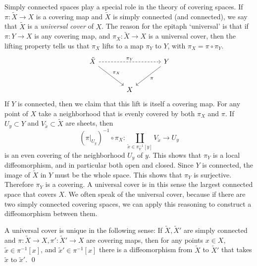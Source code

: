 Simply connected spaces play a special role in the theory of covering spaces.
If $\pi : \tilde{X} \to X$ is a covering map and $\tilde{X}$ is simply connected (and connected), we say that $\tilde{X}$ is a \emph{universal cover} of $X$.
The reason for the epitaph `universal' is that if $\pi : Y \to X$ is any covering map, and $\pi_X : \tilde{X} \to X$ is a universal cover, then the lifting property tells us that $\pi_X$ lifts to a map $\pi_Y$ to $Y$, with $\pi_X = \pi \circ \pi_Y$.
\[\begin{tikzcd}[sep=large]
\tilde{X} \arrow{rd}{\pi_X} \arrow[dashed]{rr}{\pi_Y} && Y \arrow{ld}{\pi} \\
& X &
\end{tikzcd}\]
If $Y$ is connected, then we claim that this lift is itself a covering map.
For any point of $X$ take a neighborhood that is evenly covered by both $\pi_X$ and $\pi$.
If $U_y \subset Y$ and $V_{\tilde{x}} \subset \tilde{X}$ are sheets, then
\[
(\pi|_{U_y})^{-1} \circ \pi_X : \coprod_{\tilde{x} \in \pi_Y^{-1}[y]} V_{\tilde{x}} \to U_y
\]
is an even covering of the neighborhood $U_y$ of $y$.
This shows that $\pi_Y$ is a local diffeomorphism, and in particular both open and closed.
Since $Y$ is connected, the image of $\tilde{X}$ in $Y$ must be the whole space.
This shows that $\pi_Y$ is surjective.
Therefore $\pi_Y$ is a covering.
A universal cover is in this sense the largest connected space that covers $X$.
We often speak of the universal cover, because if there are two simply connected covering spaces, we can apply this reasoning to construct a diffeomorphism between them.

\begin{corollary}
A universal cover is unique in the following sense:
If $\tilde{X},\tilde{X}'$ are simply connected and $\pi : \tilde{X} \to X, \pi': \tilde{X}'\to X$ are covering maps, then for any points $x \in X$, $\tilde{x} \in \pi^{-1}[x]$, and $\tilde{x}' \in \pi^{-1}[x]$ there is a diffeomorphism from $\tilde{X}$ to $\tilde{X}'$ that takes $\tilde{x}$ to $\tilde{x}'$.
\qed
\end{corollary}




